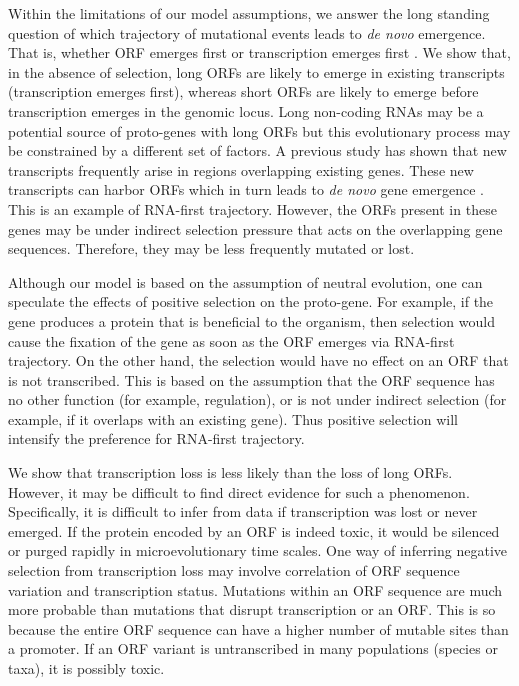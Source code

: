 \documentclass[12pt,a4paper]{article}
\begin{document}
Within the limitations of our model assumptions, we answer the long standing question of which trajectory of mutational events leads to \textit{de novo} emergence. That is, whether ORF emerges first or transcription emerges first \citep{EBB-F1000}. We show that, in the absence of selection, long ORFs are likely to emerge in existing transcripts (transcription emerges first), whereas short ORFs are likely to emerge before transcription emerges in the genomic locus. Long non-coding RNAs may be a potential source of proto-genes with long ORFs but this evolutionary process may be constrained by a different set of factors. A previous study has shown that new transcripts frequently arise in regions overlapping existing genes. These new transcripts can harbor ORFs which in turn leads to \textit{de novo} gene emergence \citep{albaYeastdenovo}. This is an example of RNA-first trajectory. However, the ORFs present in these genes may be under indirect selection pressure that acts on the overlapping gene sequences. Therefore, they may be less frequently mutated or lost.

Although our model is based on the assumption of neutral evolution, one can speculate the effects of positive selection on the proto-gene. For example, if the gene produces a protein that is beneficial to the organism, then selection would cause the fixation of the gene as soon as the ORF emerges via RNA-first trajectory. On the other hand, the selection would have no effect on an ORF that is not transcribed. This is based on the assumption that the ORF sequence has no other function (for example, regulation), or is not under indirect selection (for example, if it overlaps with an existing gene). Thus positive selection will intensify the preference for RNA-first trajectory.

We show that transcription loss is less likely than the loss of long ORFs. However, it may be difficult to find direct evidence for such a phenomenon. Specifically, it is difficult to infer from data if transcription was lost or never emerged. If the protein encoded by an ORF is indeed toxic, it would be silenced or purged rapidly in microevolutionary time scales. One way of inferring negative selection from transcription loss may involve correlation of ORF sequence variation and transcription status. Mutations within an ORF sequence are much more probable than mutations that disrupt transcription or an ORF. This is so because the entire ORF sequence can have a higher number of mutable sites than a promoter. If an ORF variant is untranscribed in many populations (species or taxa), it is possibly toxic.  
\end{document}
